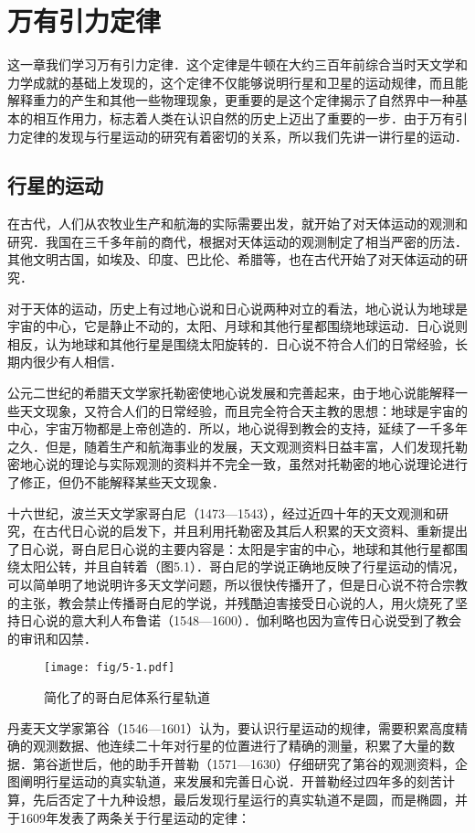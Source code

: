 \chapter{万有引力定律}

这一章我们学习万有引力定律．这个定律是牛顿在大约三百年前综合当时天文学和力学成就的基础上发现的，这个定律不仅能够说明行星和卫星的运动规律，而且能解释重力的产生和其他一些物理现象，更重要的是这个定律揭示了自然界中一种基本的相互作用力，标志着人类在认识自然的历史上迈出了重要的一步．由于万有引力定律的发现与行星运动的研究有着密切的关系，所以我们先讲一讲行星的运动．

\section{行星的运动}
在古代，人们从农牧业生产和航海的实际需要出发，就开始了对天体运动的观测和研究．我国在三千多年前的商代，根据对天体运动的观测制定了相当严密的历法．其他文明古国，如埃及、印度、巴比伦、希腊等，也在古代开始了对天体运动的研究．

对于天体的运动，历史上有过地心说和日心说两种对立的看法，地心说认为地球是宇宙的中心，它是静止不动的，太阳、月球和其他行星都围绕地球运动．日心说则相反，认为地球和其他行星是围绕太阳旋转的．日心说不符合人们的日常经验，长期内很少有人相信．	
	
公元二世纪的希腊天文学家托勒密使地心说发展和完善起来，由于地心说能解释一些天文现象，又符合人们的日常经验，而且完全符合天主教的思想：地球是宇宙的中心，宇宙万物都是上帝创造的．所以，地心说得到教会的支持，延续了一千多年之久．但是，随着生产和航海事业的发展，天文观测资料日益丰富，人们发现托勒密地心说的理论与实际观测的资料并不完全一致，虽然对托勒密的地心说理论进行了修正，但仍不能解释某些天文现象．

十六世纪，波兰天文学家哥白尼（1473—1543），经过近四十年的天文观测和研究，在古代日心说的启发下，并且利用托勒密及其后人积累的天文资料、重新提出了日心说，哥白尼日心说的主要内容是：太阳是宇宙的中心，地球和其他行星都围绕太阳公转，并且自转着（图5.1）．哥白尼的学说正确地反映了行星运动的情况，可以简单明了地说明许多天文学问题，所以很快传播开了，但是日心说不符合宗教的主张，教会禁止传播哥白尼的学说，并残酷迫害接受日心说的人，用火烧死了坚持日心说的意大利人布鲁诺（1548—1600）．伽利略也因为宣传日心说受到了教会的审讯和囚禁．
\begin{figure}\centering
\texttt{[image: fig/5-1.pdf]}
\caption{简化了的哥白尼体系行星轨道}
\end{figure}

丹麦天文学家第谷（1546—1601）认为，要认识行星运动的规律，需要积累高度精确的观测数据、他连续二十年对行星的位置进行了精确的测量，积累了大量的数据．第谷逝世后，他的助手开普勒（1571—1630）仔细研究了第谷的观测资料，企图阐明行星运动的真实轨道，来发展和完善日心说．开普勒经过四年多的刻苦计算，先后否定了十九种设想，最后发现行星运行的真实轨道不是圆，而是椭圆，并于1609年发表了两条关于行星运动的定律：

